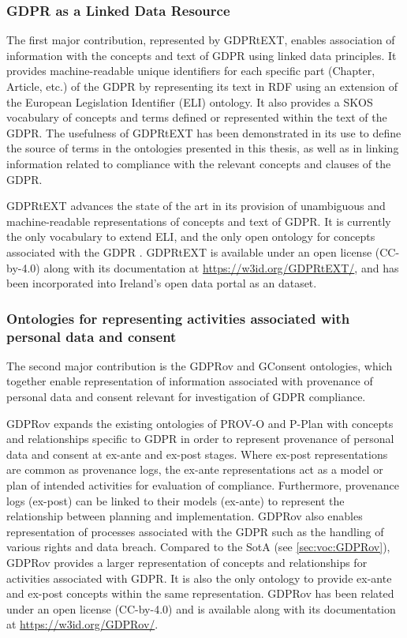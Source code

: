 \subsubsection{GDPR as a Linked Data Resource}
The first major contribution, represented by GDPRtEXT, enables association of information with the concepts and text of GDPR using linked data principles. It provides machine-readable unique identifiers for each specific part (Chapter, Article, etc.) of the GDPR by representing its text in RDF using an extension of the European Legislation Identifier (ELI) ontology. It also provides a SKOS vocabulary of concepts and terms defined or represented within the text of the GDPR. The usefulness of GDPRtEXT has been demonstrated in its use to define the source of terms in the ontologies presented in this thesis, as well as in linking information related to compliance with the relevant concepts and clauses of the GDPR.

GDPRtEXT advances the state of the art in its provision of unambiguous and machine-readable representations of concepts and text of GDPR.
It is currently the only vocabulary to extend ELI, and the only open ontology for concepts associated with the GDPR \cite{leone_taking_2019}.
GDPRtEXT is available under an open license (CC-by-4.0) along with its documentation at \url{https://w3id.org/GDPRtEXT/}, and has been incorporated into Ireland's open data portal as an dataset.

\subsubsection{Ontologies for representing activities associated with personal data and consent}
The second major contribution is the GDPRov and GConsent ontologies, which together enable representation of information associated with provenance of personal data and consent relevant for investigation of GDPR compliance.

GDPRov expands the existing ontologies of PROV-O and P-Plan with concepts and relationships specific to GDPR in order to represent provenance of personal data and consent at ex-ante and ex-post stages. Where ex-post representations are common as provenance logs, the ex-ante representations act as a model or plan of intended activities for evaluation of compliance. Furthermore, provenance logs (ex-post) can be linked to their models (ex-ante) to represent the relationship between planning and implementation. GDPRov also enables representation of processes associated with the GDPR such as the handling of various rights and data breach.
Compared to the SotA (see \autoref{sec:voc:GDPRov}), GDPRov provides a larger representation of concepts and relationships for activities associated with GDPR.
It is also the only ontology to provide ex-ante and ex-post concepts within the same representation.
GDPRov has been related under an open license (CC-by-4.0) and is available along with its documentation at \url{https://w3id.org/GDPRov/}.

